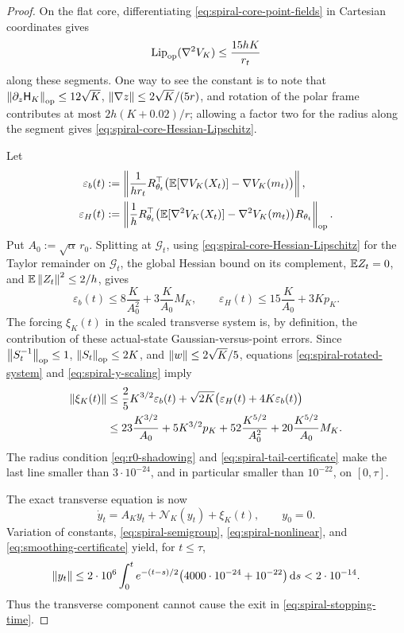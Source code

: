 \begin{proof}
On the flat core, differentiating \eqref{eq:spiral-core-point-fields} in Cartesian coordinates gives
\begin{equation}
\label{eq:spiral-core-Hessian-Lipschitz}
 \operatorname{Lip}_{\mathrm{op}}(\nabla^2V_K)
 \leq\frac{15hK}{r_t}
\end{equation}
along these segments.  One way to see the constant is to note that
$\left\lVert \partial_z\mathsf H_K\right\rVert_{\mathrm{op}}\leq12\sqrt K$,
$\left\lVert \nabla z\right\rVert\leq2\sqrt K/(5r)$, and rotation of the polar frame contributes at most
$2h(K+0.02)/r$; allowing a factor two for the radius along the segment gives
\eqref{eq:spiral-core-Hessian-Lipschitz}.

Let
\begin{align*}
 \varepsilon_b(t)
 &:=\left\|\frac1{hr_t}R_{\theta_t}^\top
   \bigl(\mathbb{E}[\nabla V_K(X_t)]-\nabla V_K(m_t)\bigr)\right\|,\\
 \varepsilon_H(t)
 &:=\left\|\frac1hR_{\theta_t}^\top
   \bigl(\mathbb{E}[\nabla^2V_K(X_t)]-\nabla^2V_K(m_t)\bigr)
   R_{\theta_t}\right\|_{\mathrm{op}}.
\end{align*}
Put $A_0:=\sqrt\alpha\,r_0$.  Splitting at $\mathcal G_t$, using
\eqref{eq:spiral-core-Hessian-Lipschitz} for the Taylor remainder on $\mathcal G_t$, the global
Hessian bound on its complement, $\mathbb{E} Z_t=0$, and
$\mathbb{E}\left\lVert Z_t\right\rVert^2\leq2/h$, gives
\begin{equation}
\label{eq:spiral-average-errors}
 \varepsilon_b(t)\leq8\frac K{A_0^2}+3\frac K{A_0}M_K,
 \qquad
 \varepsilon_H(t)\leq15\frac K{A_0}+3Kp_K.
\end{equation}
The forcing $\xi_K(t)$ in the scaled transverse system is, by definition, the contribution of
these actual-state Gaussian-versus-point errors.  Since
$\left\lVert S_t^{-1}\right\rVert_{\mathrm{op}}\leq1$, $\left\lVert S_t\right\rVert_{\mathrm{op}}\leq2K$, and
$\left\lVert w\right\rVert\leq2\sqrt K/5$, equations \eqref{eq:spiral-rotated-system} and
\eqref{eq:spiral-y-scaling} imply
\begin{align}
\label{eq:smoothing-certificate}
 \left\lVert \xi_K(t)\right\rVert
 &\leq\frac25K^{3/2}\varepsilon_b(t)
   +\sqrt{2K}\bigl(\varepsilon_H(t)+4K\varepsilon_b(t)\bigr)\notag\\
 &\leq23\frac{K^{3/2}}{A_0}
   +5K^{3/2}p_K
   +52\frac{K^{5/2}}{A_0^2}
   +20\frac{K^{5/2}}{A_0}M_K.
\end{align}
The radius condition \eqref{eq:r0-shadowing} and \eqref{eq:spiral-tail-certificate} make the last
line smaller than $3\cdot10^{-24}$, and in particular smaller than $10^{-22}$, on $[0,\tau]$.

The exact transverse equation is now
\begin{equation}
\label{eq:transverse-system}
 \dot y_t=A_Ky_t+\mathcal N_K(y_t)+\xi_K(t),
 \qquad y_0=0.
\end{equation}
Variation of constants, \eqref{eq:spiral-semigroup}, \eqref{eq:spiral-nonlinear}, and
\eqref{eq:smoothing-certificate} yield, for $t\leq\tau$,
\[
 \left\lVert y_t\right\rVert
 \leq2\cdot10^6\int_0^te^{-(t-s)/2}
 \bigl(4000\cdot10^{-24}+10^{-22}\bigr)\,\mathrm{d} s
 <2\cdot10^{-14}.
\]
Thus the transverse component cannot cause the exit in \eqref{eq:spiral-stopping-time}.


\end{proof}

